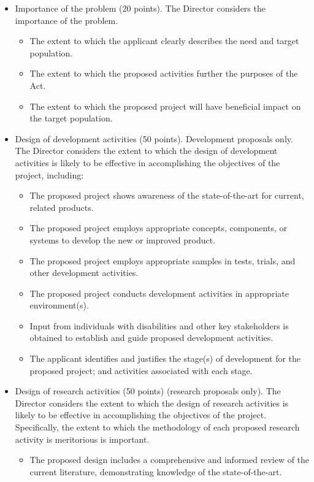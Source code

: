 \begin{itemize}
    \item Importance of the problem (20 points). The Director considers the importance of the problem.
    \begin{itemize}
\item  The extent to which the applicant clearly describes the need and target population.
\item The extent to which the proposed activities further the purposes of the Act.
\item  The extent to which the proposed project will have beneficial impact on the target population.
    \end{itemize}
    \item Design of development activities (50 points). Development proposals only. The Director considers the extent to which the design of development activities is likely to be effective in accomplishing the objectives of the project, including: 
    \begin{itemize}
\item The proposed project shows awareness of the state-of-the-art for current, related products. 
\item The proposed project employs appropriate concepts, components, or systems to develop the new or improved product.
\item  The proposed project employs appropriate samples in tests, trials, and other development activities.
\item The proposed project conducts development activities in appropriate environment(s).
\item Input from individuals with disabilities and other key stakeholders is obtained to establish and guide proposed development activities.
\item The applicant identifies and justifies the stage(s) of development for the proposed project; and activities associated with each stage.
    \end{itemize}
\item Design of research activities (50 points) (research proposals only). The Director considers the extent to which the design of research activities is likely to be effective in accomplishing the objectives of the project. Specifically, the extent to which the methodology of each proposed research activity is meritorious is important.
\begin{itemize}
    \item The proposed design includes a comprehensive and informed review of the current literature, demonstrating knowledge of the state-of-the-art.

\end{itemize}
\end{itemize}
